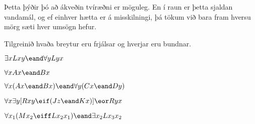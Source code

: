 Þetta þýðir þó að ákveðin tvíræðni er möguleg. En í raun er þetta sjaldan vandamál, og ef einhver hætta er á misskilningi, þá tökum við bara fram hversu mörg sæti hver umsögn hefur.


\practiceproblems
\problempart
\label{pr.freeFOL}
Tilgreinið hvaða breytur eru frjálsar og hverjar eru bundnar.
\begin{earg}
\item $\exists x Lxy \eand \forall y Lyx$
\item $\forall x Ax \eand Bx$
\item $\forall x (Ax \eand Bx) \eand \forall y(Cx \eand Dy)$
\item $\forall x\exists y[Rxy \eif (Jz \eand Kx)] \eor Ryx$
\item $\forall x_1(Mx_2 \eiff Lx_2x_1) \eand \exists x_2 Lx_3x_2$
\end{earg}